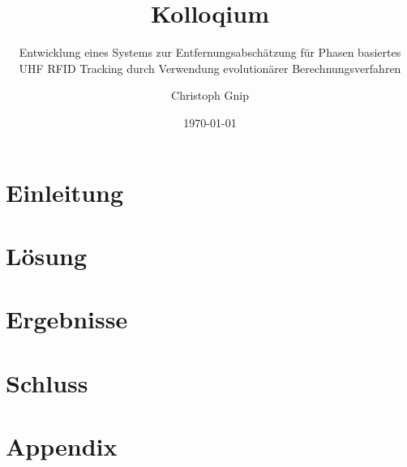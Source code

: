 \documentclass[10pt, draft]{beamer}
\title{Kolloqium}
\subtitle{Entwicklung eines Systems zur
			  Entfernungsabschätzung für
			  Phasen basiertes UHF 
			  RFID Tracking durch 
			  Verwendung evolutionärer
			  Berechnungsverfahren}
\author{Christoph Gnip}
\date{\today}
\begin{document}
\maketitle
\frame{\tableofcontents}

\section{Einleitung}

\section{Lösung}

\section{Ergebnisse}

\section{Schluss}

%
\section{Appendix}

%


\end{document}
